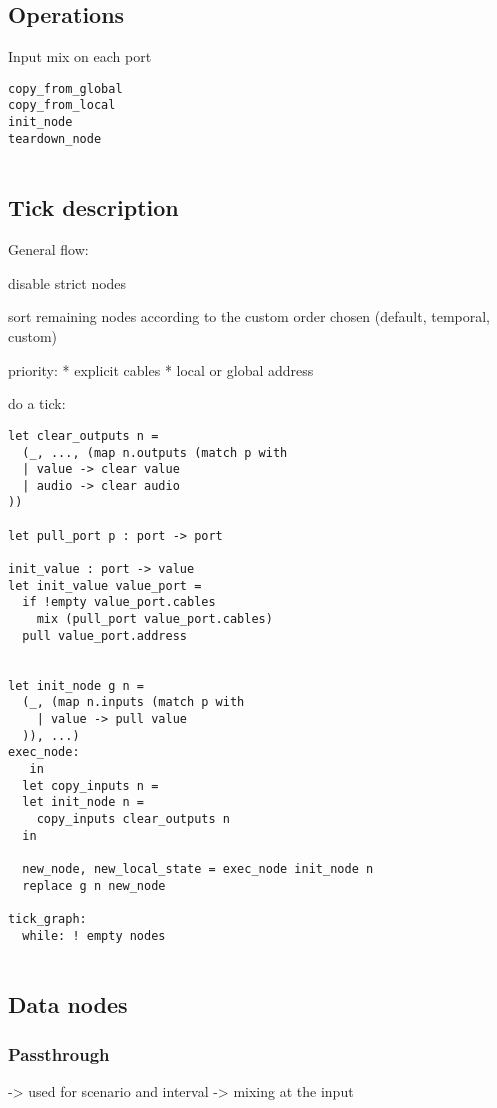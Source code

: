 \documentclass[applsci,article,submit,moreauthors,pdftex,10pt,a4paper]{mdpi}
\begin{document}
\subsection{Operations}
Input mix on each port

\begin{lstlisting}
copy_from_global
copy_from_local
init_node
teardown_node


\end{lstlisting} 


\subsection{Tick description}

General flow: 

disable strict nodes

sort remaining nodes according to the custom order chosen (default, temporal, custom)

priority: 
* explicit cables
* local or global address

do a tick: 

\begin{lstlisting}
let clear_outputs n = 
  (_, ..., (map n.outputs (match p with 
  | value -> clear value
  | audio -> clear audio
))

let pull_port p : port -> port 

init_value : port -> value
let init_value value_port = 
  if !empty value_port.cables
    mix (pull_port value_port.cables)
  pull value_port.address


let init_node g n = 
  (_, (map n.inputs (match p with 
    | value -> pull value
  )), ...) 
exec_node: 
   in
  let copy_inputs n = 
  let init_node n = 
    copy_inputs clear_outputs n      
  in 
  
  new_node, new_local_state = exec_node init_node n
  replace g n new_node 
    
tick_graph: 
  while: ! empty nodes 
  
\end{lstlisting}



\subsection{Data nodes}
\subsubsection{Passthrough}
-> used for scenario and interval
-> mixing at the input
\end{document}
